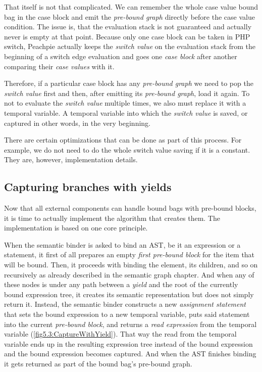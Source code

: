 That itself is not that complicated. We can remember the whole case value bound bag in the case block and emit the \emph{pre-bound graph} directly before the case value condition. The issue is, that the evaluation stack is not guaranteed and actually never is empty at that point. Because only one case block can be taken in PHP switch, Peachpie actually keeps the \emph{switch value} on the evaluation stack from the beginning of a switch edge evaluation and goes one \emph{case block} after another comparing their \emph{case values} with it.

Therefore, if a particular case block has any \emph{pre-bound graph} we need to pop the \emph{switch value} first and then, after emitting its \emph{pre-bound graph}, load it again. To not to evaluate the \emph{switch value} multiple times, we also must replace it with a temporal variable. A temporal variable into which the \emph{switch value} is saved, or captured in other words, in the very beginning.

There are certain optimizations that can be done as part of this process. For example, we do not need to do the whole switch value saving if it is a constant. They are, however, implementation details. 

\subsection{Capturing branches with yields}

Now that all external components can handle bound bags with pre-bound blocks, it is time to actually implement the algorithm that creates them. The implementation is based on one core principle. 

When the semantic binder is asked to bind an AST, be it an expression or a statement, it first of all prepares an empty \emph{first pre-bound block} for the item that will be bound. Then, it proceeds with binding the element, its children, and so on recursively as already described in the semantic graph chapter. And when any of these nodes is under any path between a \emph{yield} and the root of the currently bound expression tree, it creates its semantic representation but does not simply return it. Instead, the semantic binder constructs a new \emph{assignment statement} that sets the bound expression to a new temporal variable, puts said statement into the current \emph{pre-bound block}, and returns a \emph{read expression} from the temporal variable (\autoref{fig5.3:CaptureWithYield}). That way the read from the temporal variable ends up in the resulting expression tree instead of the bound expression and the bound expression becomes captured. And when the AST finishes binding it gets returned as part of the bound bag’s pre-bound graph.


